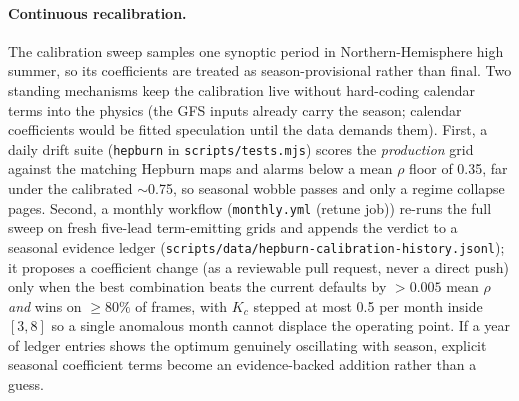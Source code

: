 \documentclass[11pt,a4paper]{article}
\begin{document}
\paragraph{Continuous recalibration.}  The calibration sweep samples
one synoptic period in Northern-Hemisphere high summer, so its
coefficients are treated as season-provisional rather than final.
Two standing mechanisms keep the calibration live without
hard-coding calendar terms into the physics (the GFS inputs
already carry the season; calendar coefficients would be fitted
speculation until the data demands them).  First, a daily drift
suite (\texttt{hepburn} in \texttt{scripts/tests.mjs}) scores the
\emph{production} grid against the matching Hepburn maps and
alarms below a mean $\rho$ floor of 0.35, far under the
calibrated ${\sim}$0.75, so seasonal wobble passes and only a
regime collapse pages.  Second, a monthly workflow
(\texttt{monthly.yml} (retune job)) re-runs the full sweep on
fresh five-lead term-emitting grids and appends the verdict to a
seasonal evidence ledger
(\texttt{scripts/data/hepburn-calibration-history.jsonl}); it
proposes a coefficient change (as a reviewable pull request,
never a direct push) only when the best combination beats the
current defaults by $> 0.005$ mean $\rho$ \emph{and} wins on
$\ge 80\%$ of frames, with $K_c$ stepped at most 0.5 per month
inside $[3, 8]$ so a single anomalous month cannot displace the
operating point.  If a year of ledger entries shows the optimum
genuinely oscillating with season, explicit seasonal coefficient
terms become an evidence-backed addition rather than a guess.
\end{document}

